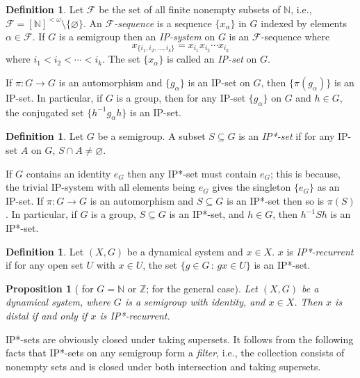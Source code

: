 \documentclass[11pt]{amsart}
\newtheorem{proposition}[theorem]{Proposition}
\theoremstyle{definition}
\newtheorem{definition}[theorem]{Definition}
\numberwithin{equation}{section}
\theoremstyle{definition}
\begin{document}
\begin{definition} Let $\mathcal{F}$ be the set of all finite nonempty subsets of $\mathbb{N}$, i.e., $\mathcal{F}=[\mathbb{N}]^{<\omega}\setminus\{\varnothing\}$. An {\em $\mathcal{F}$-sequence} is a sequence $\{x_\alpha\}$ in $G$ indexed by elements $\alpha\in\mathcal{F}$. If $G$ is a semigroup then an {\em IP-system} on $G$ is an $\mathcal{F}$-sequence where
$$ x_{\{i_1,i_2,\dots, i_k\}}=x_{i_1}x_{i_2}\cdots x_{i_k} $$
where $i_1<i_2<\cdots<i_k$. The set $\{x_\alpha\}$ is called an {\em IP-set} on $G$.
\end{definition}

If $\pi: G\to G$ is an automorphism and $\{g_{\alpha}\}$ is an IP-set on $G$, then $\{\pi(g_{\alpha})\}$ is an IP-set. In particular, if $G$ is a group, then for any IP-set $\{g_{\alpha}\}$ on $G$ and $h\in G$, the conjugated set $\{h^{-1}g_{\alpha}h\}$ is an IP-set.

\begin{definition} Let $G$ be a semigroup. A subset $S\subseteq G$ is an {\em IP*-set} if for any IP-set $A$ on $G$, $S\cap A\neq\varnothing$.
\end{definition}
If $G$ contains an identity $e_G$ then any IP*-set must contain $e_G$; this is because, the trivial IP-system with all elements being $e_G$ gives the singleton $\{e_G\}$ as an IP-set.
If $\pi:G\to G$ is an automorphism and $S\subseteq G$ is an IP*-set then so is $\pi(S)$. In particular, if $G$ is a group, $S\subseteq G$ is an IP*-set, and $h\in G$, then $h^{-1}Sh$ is an IP*-set.

\begin{definition} Let $(X, G)$ be a dynamical system and $x\in X$. $x$ is {\em IP*-recurrent} if for any open set $U$ with $x\in U$, the set $\{g\in G\,:\, gx\in U\}$ is an IP*-set.
\end{definition}

\begin{proposition}[\cite{Fur} for $G=\mathbb{N}$ or $\mathbb{Z}$; {\cite[Theorem 4]{DLX}} for the general case]  Let $(X, G)$ be a dynamical system, where $G$ is a semigroup with identity, and $x\in X$. Then $x$ is distal if and only if $x$ is IP*-recurrent.
\end{proposition}

IP*-sets are obviously closed under taking supersets. It follows from the following facts that IP*-sets on any semigroup form a {\em filter}, i.e., the collection consists of nonempty sets and is closed under both intersection and taking supersets.
\end{document}
